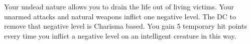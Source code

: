 \shortfeat
{Your undead nature allows you to drain the life out of living victims.}
{Your unarmed attacks and natural weapons inflict one negative level. The DC to remove that negative level is Charisma based. You gain 5 temporary hit points every time you inflict a negative level on an intelligent creature in this way.}

